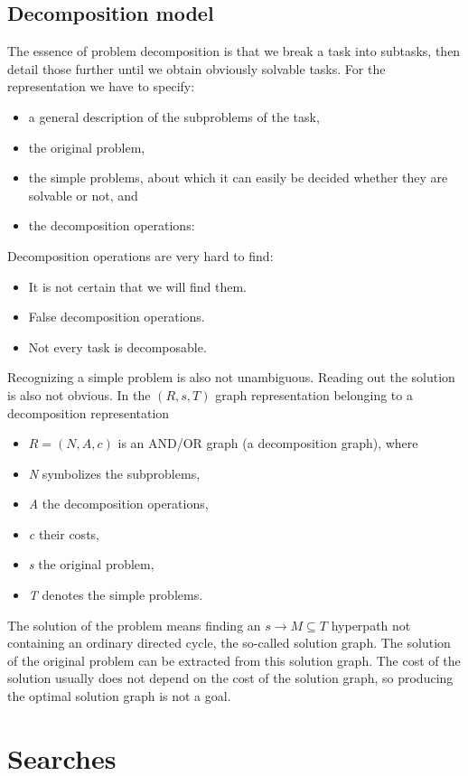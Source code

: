 \documentclass[margin=0px]{article}
\begin{document}
\subsection{Decomposition model}
The essence of problem decomposition is that we break a task into subtasks, then detail those further until we obtain obviously solvable tasks. For the representation we have to specify:
\begin{itemize}
    \item a general description of the subproblems of the task,
    \item the original problem,
    \item the simple problems, about which it can easily be decided whether they are solvable or not, and
    \item the decomposition operations:
\end{itemize}
Decomposition operations are very hard to find:
\begin{itemize}
    \item It is not certain that we will find them.
    \item False decomposition operations.
    \item Not every task is decomposable.
\end{itemize}
Recognizing a simple problem is also not unambiguous. Reading out the solution is also not obvious.
In the $( R, s, T )$ graph representation belonging to a decomposition representation
\begin{itemize}
    \item $R = ( N, A, c )$ is an AND/OR graph (a decomposition graph), where
    \item {\it N} symbolizes the subproblems,
    \item {\it A} the decomposition operations,
    \item {\it c} their costs,
    \item {\it s} the original problem,
    \item {\it T} denotes the simple problems.
\end{itemize}

The solution of the problem means finding an $s \rightarrow M \subseteq T$ hyperpath not containing an ordinary directed cycle, the so-called solution graph. The solution of the original problem can be extracted from this solution graph. The cost of the solution usually does not depend on the cost of the solution graph, so producing the optimal solution graph is not a goal.

\section{Searches}
\end{document}
